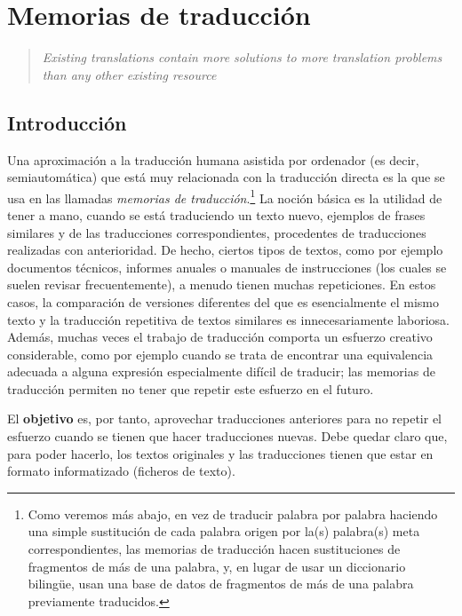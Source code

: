 \chapter{Memorias de traducción} \label{se:memtrad} 

\begin{quote} \textsl{Existing translations contain more solutions to more translation problems than any other existing resource} \citep{isabelle93p} \end{quote} 

\section{Introducción} 

Una aproximación a la traducción humana asistida por ordenador (es decir, semiautomática) que está muy relacionada con la traducción directa es la que se usa en las llamadas \emph{memorias de traducción}.\footnote{Como veremos más abajo, en vez de traducir palabra por palabra haciendo una simple sustitución de cada palabra origen por la(s) palabra(s) meta correspondientes, las memorias de traducción hacen sustituciones de fragmentos de más de una palabra, y, en lugar de usar un diccionario bilingüe, usan una base de datos de fragmentos de más de una palabra previamente traducidos.} La noción básica \citep{somers96b,samuelson-brown96b} es la utilidad de tener a mano, cuando se está traduciendo un texto nuevo, ejemplos de frases similares y de las traducciones correspondientes, procedentes de traducciones realizadas con anterioridad. De hecho, ciertos tipos de textos, como por ejemplo documentos técnicos, informes anuales o manuales de instrucciones (los cuales se suelen revisar frecuentemente), a menudo tienen muchas repeticiones. En estos casos, la comparación de versiones diferentes del que es esencialmente el mismo texto y la traducción repetitiva de textos similares es innecesariamente laboriosa. Además, muchas veces el trabajo de traducción comporta un esfuerzo creativo considerable, como por ejemplo cuando se trata de encontrar una equivalencia adecuada a alguna expresión especialmente difícil de traducir; las memorias de traducción permiten no tener que repetir este esfuerzo en el futuro. 

El \textbf{objetivo} es, por tanto, aprovechar traducciones anteriores para no repetir el esfuerzo cuando se tienen que hacer traducciones nuevas. Debe quedar claro que, para poder hacerlo, los textos originales y las traducciones tienen que estar en formato informatizado (ficheros de texto). 

